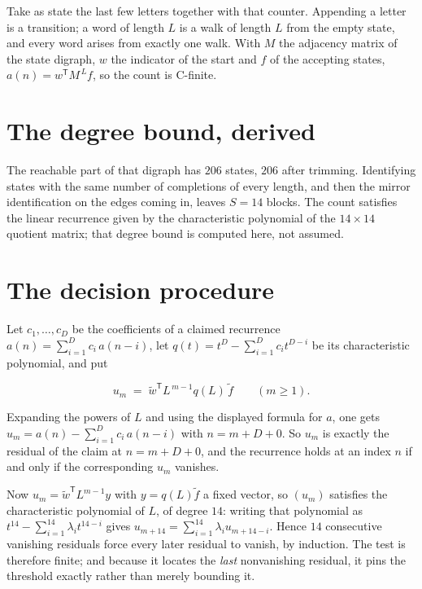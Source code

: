 \documentclass[11pt]{article}
\theoremstyle{definition}
\begin{document}
Take as state the last few letters together with that counter. Appending a letter is a transition; a word of length $L$ is a walk of length $L$ from the empty state, and every word arises from exactly one walk. With $M$ the adjacency matrix of the state digraph, $w$ the indicator of the start and $f$ of the accepting states, $a(n) = w^{\mathsf T}M^{\,L}f$, so the count is C-finite.

\section{The degree bound, derived}

The reachable part of that digraph has $206$ states, $206$ after trimming. Identifying states with the same number of completions of every length, and then the mirror identification on the edges coming in, leaves $S = 14$ blocks. The count satisfies the linear recurrence given by the characteristic polynomial of the $14\times14$ quotient matrix; that degree bound is computed here, not assumed.

\section{The decision procedure}

Let $c_1,\dots,c_D$ be the coefficients of a claimed recurrence $a(n) = \sum_{i=1}^{D} c_i\,a(n-i)$, let $q(t) = t^{D} - \sum_{i=1}^{D} c_i t^{D-i}$ be its characteristic polynomial, and put

\[u_m \;=\; \tilde w^{\mathsf T} L^{\,m-1} q(L)\,\tilde f \qquad (m \ge 1).\]

Expanding the powers of $L$ and using the displayed formula for $a$, one gets $u_m = a(n) - \sum_{i=1}^{D} c_i\,a(n-i)$ with $n = m + D + 0$. So $u_m$ is exactly the residual of the claim at $n = m + D + 0$, and the recurrence holds at an index $n$ if and only if the corresponding $u_m$ vanishes.

Now $u_m = \tilde w^{\mathsf T} L^{m-1} y$ with $y = q(L)\tilde f$ a fixed vector, so $(u_m)$ satisfies the characteristic polynomial of $L$, of degree $14$: writing that polynomial as $t^{14} - \sum_{i=1}^{14} \lambda_i t^{14-i}$ gives $u_{m+14} = \sum_{i=1}^{14} \lambda_i u_{m+14-i}$. Hence $14$ consecutive vanishing residuals force every later residual to vanish, by induction. The test is therefore finite; and because it locates the {\itshape last} nonvanishing residual, it pins the threshold exactly rather than merely bounding it.
\end{document}
